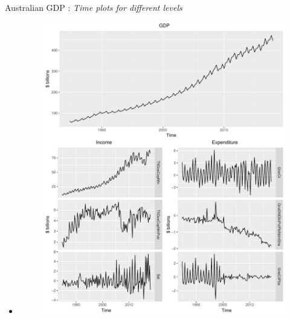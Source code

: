 \documentclass[11pt,xcolor=dvipsnames,handout]{beamer} %
\begin{document}
\begin{frame}{Australian GDP : \textit{Time plots for different levels}}
\begin{itemize}[<+-| alert@+>]
	\item[] 
	\begin{figure}

		\centering
		\small
		\includegraphics[scale=0.30]{Figs/TS-plots/TSplots-INC-EXP.pdf}
		
	\end{figure}
	
\end{itemize}
\end{frame}


\end{document}
